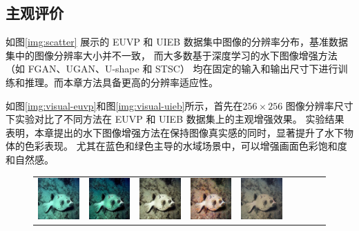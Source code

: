 \subsection{主观评价}
如图\ref{img:scatter} 展示的 EUVP 和 UIEB 数据集中图像的分辨率分布，基准数据集中的图像分辨率大小并不一致，
而大多数基于深度学习的水下图像增强方法（如 FGAN\cite{funie_gan}、UGAN\cite{ugan}、U-shape\cite{u-shape} 和 STSC\cite{stsc}）
均在固定的输入和输出尺寸下进行训练和推理。而本章方法具备更高的分辨率适应性。

如图\ref{img:visual-euvp}和图\ref{img:visual-uieb}所示，首先在$256 \times 256$ 图像分辨率尺寸下实验对比了不同方法在 EUVP 和 UIEB 数据集上的主观增强效果。
实验结果表明，本章提出的水下图像增强方法在保持图像真实感的同时，显著提升了水下物体的色彩表现。
尤其在蓝色和绿色主导的水域场景中，可以增强画面色彩饱和度和自然感。
\begin{figure}[t]
	\begin{center}
		\begin{tabular}{ccccccccc}
			\includegraphics[width = 0.10\linewidth,height=0.10\linewidth]{figures/ch3/compare/EUVP/Input/264318_n02655020_17544.JPEG} & \hspace{-0.40cm}
			\includegraphics[width = 0.10\linewidth,height=0.10\linewidth]{figures/ch3/compare/EUVP/UDCP/264318_n02655020_17544.JPEG}  & \hspace{-0.40cm}
			\includegraphics[width = 0.10\linewidth,height=0.10\linewidth]{figures/ch3/compare/EUVP/UGAN/264318_n02655020_17544.JPEG}  & \hspace{-0.40cm}
			\includegraphics[width = 0.10\linewidth,height=0.10\linewidth]{figures/ch3/compare/EUVP/FGAN/264318_n02655020_17544.JPEG}  & \hspace{-0.40cm}
			\includegraphics[width = 0.10\linewidth,height=0.10\linewidth]{figures/ch3/compare/EUVP/UWCNN/264318_n02655020_17544.JPEG} & \hspace{-0.40cm}

\end{tabular}
\end{center}
\end{figure}
